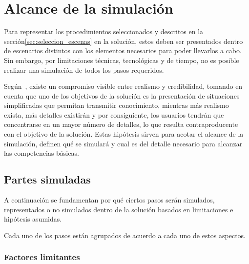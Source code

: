 \section{Alcance de la simulación}
\label{sec:hipotesis}

    
Para representar los procedimientos seleccionados y descritos en la sección\ref{sec:seleccion_escenas}
en la solución, estos deben ser presentados dentro de escenarios distintos con 
los elementos necesarios para poder llevarlos a cabo. Sin embargo, 
por limitaciones técnicas, tecnológicas y de tiempo, no es posible realizar 
una simulación de todos los pasos requeridos.


Según~\cite{videojuegos:gonzaleztardon}, existe un compromiso visible entre
realismo y credibilidad, tomando en cuenta que uno de los objetivos de la
solución es la presentación de situaciones simplificadas que permitan transmitir
conocimiento, mientras más realismo exista, más detalles existirán y por
consiguiente, los usuarios tendrán que concentrarse en un mayor número de
detalles, lo que resulta contraproducente con el objetivo de la
solución\cite{videojuegos:gonzaleztardon}. Estas hipótesis sirven para acotar el
alcance de la simulación, definen qué se simulará y cual es del detalle
necesario para alcanzar las competencias básicas.


\subsection{Partes simuladas}

A continuación se fundamentan por qué ciertos pasos serán simulados, representados 
o no simulados dentro de la solución basados en limitaciones e hipótesis asumidas.

Cada uno de los pasos están agrupados de acuerdo a cada uno de estos aspectos.

\subsubsection{Factores limitantes}

